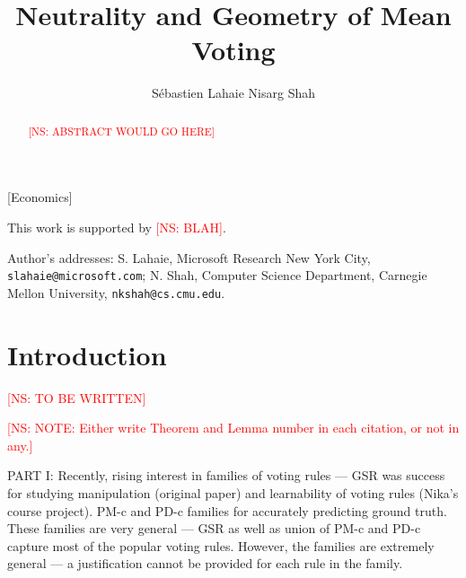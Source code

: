 \documentclass[prodmode,acmec]{ec-acmsmall}
\newcommand{\kibitz}[2]{\ifnum\Comments=1\textcolor{#1}{#2}\fi}
\newcommand{\ns}[1]{\kibitz{red} {[NS: #1]}}
\begin{document}

\title{Neutrality and Geometry of Mean Voting}
\author{S\'{e}bastien Lahaie
Nisarg Shah
}

\begin{abstract}
\ns{ABSTRACT WOULD GO HERE}
\end{abstract}

[Economics]




\begin{bottomstuff}
This work is supported by \ns{BLAH}.

Author's addresses: S. Lahaie, Microsoft Research New York City, {\small\tt slahaie@microsoft.com}; N. Shah, Computer Science Department, Carnegie Mellon University, {\small\tt nkshah@cs.cmu.edu}.
\end{bottomstuff}

\maketitle

\section{Introduction}
\label{sec:intro}
\ns{TO BE WRITTEN}

\ns{NOTE: Either write Theorem and Lemma number in each citation, or not in any.}

PART I: Recently, rising interest in families of voting rules --- GSR was success for studying manipulation (original paper) and learnability of voting rules (Nika's course project). PM-c and PD-c families for accurately predicting ground truth. These families are very general --- GSR as well as union of PM-c and PD-c capture most of the popular voting rules. However, the families are extremely general --- a justification cannot be provided for each rule in the family. 
\end{document}
